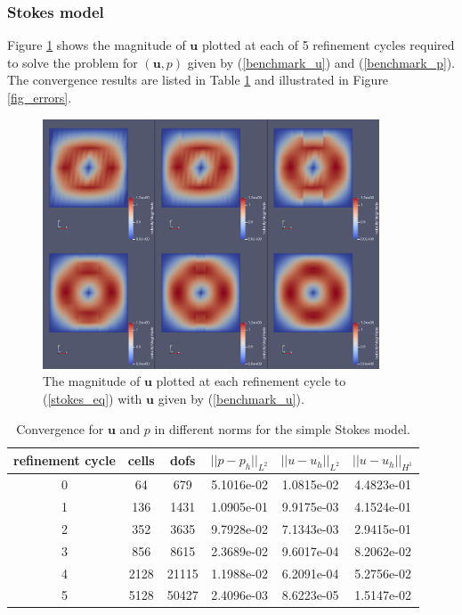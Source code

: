 \documentclass[12pt,a4paper]{article}
\theoremstyle{definition}
\begin{document}
\subsubsection{Stokes model}
Figure \ref{fig_stokes_sol}  shows the magnitude of $\textbf{u}$ plotted at each of 5 refinement cycles required to solve the problem for $\left(\textbf{u}, p\right)$ given by (\ref{benchmark_u}) and (\ref{benchmark_p}).  The convergence results are listed in Table \ref{tablebenchmark_convergence} and illustrated in Figure \ref{fig_errors}.
\begin{figure}[H]
	\centering
	\includegraphics[width=10cm]{stokes_cg_velocities}
	\caption{The magnitude of $\textbf{u}$ plotted at each refinement cycle to (\ref{stokes_eq}) with $\textbf{u}$ given by (\ref{benchmark_u}).}
	\label{fig_stokes_sol}
\end{figure}
\begin{table}[H]
	\begin{center}
		\begin{tabular}{|c|c|c|c|c|c|} \hline
			refinement cycle & cells & dofs & $||p-p_h||_{L^2}$ & $||u-u_h||_{L^2}$ & $||u-u_h||_{H^1}$\\ \hline
			0 & 64 & 679 & 5.1016e-02 & 1.0815e-02 & 4.4823e-01\\ \hline
			1 & 136 & 1431 & 1.0905e-01 & 9.9175e-03 & 4.1524e-01\\ \hline
			2 & 352 & 3635 & 9.7928e-02 & 7.1343e-03 & 2.9415e-01\\ \hline
			3 & 856 & 8615 & 2.3689e-02 & 9.6017e-04 & 8.2062e-02\\ \hline
			4 & 2128 & 21115 & 1.1988e-02 & 6.2091e-04 & 5.2756e-02\\ \hline
			5 & 5128 & 50427 & 2.4096e-03 & 8.6223e-05 & 1.5147e-02\\ \hline
		\end{tabular}
		\caption{Convergence for $\textbf{u}$ and $p$ in different norms for the simple Stokes model.}
		\label{tablebenchmark_convergence}
	\end{center}
\end{table}
\end{document}
